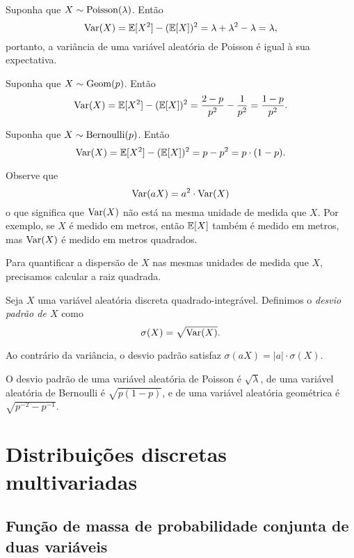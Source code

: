 \begin{example}
[Poisson]
Suponha que $ X \sim \mathrm{Poisson}(\lambda) $.
Então
\[
\mathrm{Var}(X) = \mathbb{E}[X^2] - (\mathbb{E}[X])^2 = \lambda + \lambda^2 - \lambda = \lambda,
\]
portanto, a variância de uma variável aleatória de Poisson é igual à sua expectativa.
\end{example}

\begin{example}
[Geométrica]
Suponha que $ X \sim \mathrm{Geom}(p) $.
Então
\[
\mathrm{Var}(X) = \mathbb{E}[X^2] - (\mathbb{E}[X])^2 =
\frac{2-p}{p^2}
-
\frac{1}{p^2}
=
\frac{1-p}{p^2}
.
\]
\end{example}

\begin{example}
[Bernoulli]
Suponha que $ X \sim \mathrm{Bernoulli}(p) $.
Então
\[
\mathrm{Var}(X) = \mathbb{E}[X^2] - (\mathbb{E}[X])^2 =
p - p^2
=
p\cdot (1-p)
.
\]
\end{example}

Observe que
\[
\mathrm{Var} (aX) = a^2 \cdot \mathrm{Var} (X)
\]
o que significa que $ \mathrm{Var}(X) $ não está na mesma unidade de medida que $ X $.
Por exemplo, se $ X $ é medido em metros, então $ \mathbb{E}[X] $ também é medido em metros, mas $ \mathrm{Var}(X) $ é medido em metros quadrados.

Para quantificar a dispersão de $ X $ nas mesmas unidades de medida que $ X $, precisamos calcular a raiz quadrada.

\begin{definition}
Seja $ X $ uma variável aleatória discreta quadrado-integrável.
Definimos o \emph{desvio padrão de $ X $} como
\[
\sigma(X) = \sqrt{\mathrm{Var}(X)}
.
\]
\end{definition}

Ao contrário da variância, o desvio padrão satisfaz $ \sigma(aX) = |a| \cdot \sigma(X) $.

O desvio padrão de uma variável aleatória de Poisson é $ \sqrt{\lambda} $, de uma variável aleatória de Bernoulli é $ \sqrt{p(1-p)} $, e de uma variável aleatória geométrica é $ \sqrt{p^{-2}-p^{-1}} $.


\clearpage
\section{Distribuições discretas multivariadas}

\subsection{Função de massa de probabilidade conjunta de duas variáveis}

